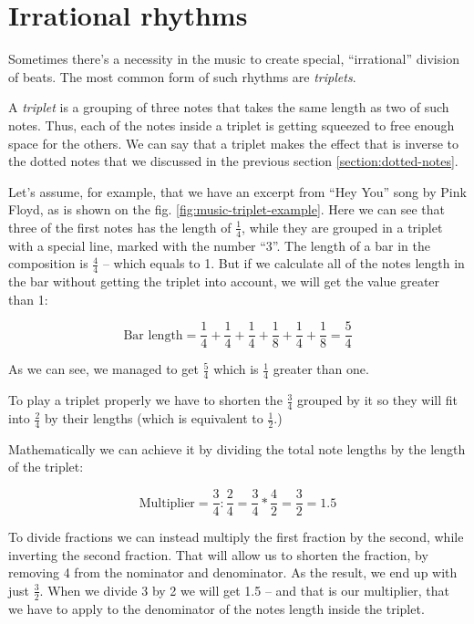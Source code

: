 \documentclass[../sparc.tex]{subfiles}
\begin{document}
\section{Irrational rhythms}

Sometimes there's a necessity in the music to create special, ``irrational''
division of beats.  The most common form of such rhythms are \emph{triplets}.

A \emph{triplet} is a grouping of three notes that takes the same length as two
of such notes.  Thus, each of the notes inside a triplet is getting squeezed to
free enough space for the others.  We can say that a triplet makes the effect
that is inverse to the dotted notes that we discussed in the previous section
\ref{section:dotted-notes}.


Let's assume, for example, that we have an excerpt from ``Hey You'' song by Pink
Floyd, as is shown on the fig. \ref{fig:music-triplet-example}.  Here we can see
that three of the first notes has the length of $\frac{1}{4}$, while they are
grouped in a triplet with a special line, marked with the number ``3''.  The
length of a bar in the composition is $\frac{4}{4}$ -- which equals to 1.  But if
we calculate all of the notes length in the bar without getting the triplet into
account, we will get the value greater than 1:

\begin{equation}
  \mbox{Bar length} = \frac{1}{4} + \frac{1}{4}
  + \frac{1}{4} + \frac{1}{8} + \frac{1}{4} + \frac{1}{8} = \frac{5}{4}
\end{equation}

As we can see, we managed to get $\frac{5}{4}$ which is $\frac{1}{4}$ greater
than one.

To play a triplet properly we have to shorten the $\frac{3}{4}$ grouped by it so
they will fit into $\frac{2}{4}$ by their lengths (which is equivalent to
$\frac{1}{2}$.)

Mathematically we can achieve it by dividing the total note lengths by the
length of the triplet:

\begin{equation}
  \mbox{Multiplier} = \frac{3}{4} : \frac{2}{4} = \frac{3}{4} * \frac{4}{2}
  = \frac{3}{2} = 1.5
\end{equation}

To divide fractions we can instead multiply the first fraction by the second,
while inverting the second fraction.  That will allow us to shorten the
fraction, by removing 4 from the nominator and denominator.  As the result, we
end up with just $\frac{3}{2}$.  When we divide 3 by 2 we will get 1.5 -- and
that is our multiplier, that we have to apply to the denominator of the notes
length inside the triplet.
\end{document}
